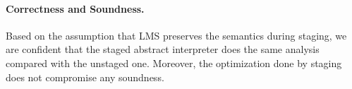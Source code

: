 
\paragraph{Correctness and Soundness.}
Based on the assumption that LMS preserves the semantics during staging,
we are confident that the staged abstract interpreter does the same analysis compared 
with the unstaged one. Moreover, the optimization done by staging does not compromise
any soundness.

